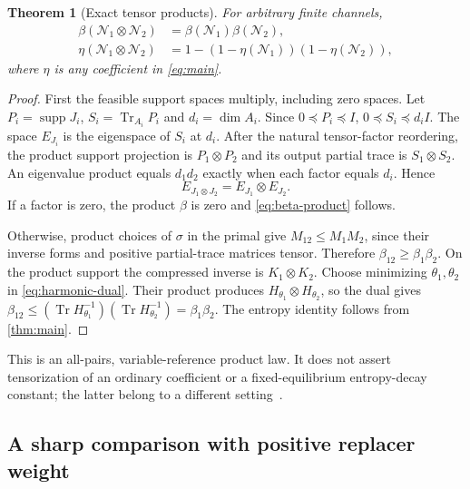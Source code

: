 \documentclass[11pt]{article}
\numberwithin{equation}{section}
\newtheorem{theorem}{Theorem}[section]
\theoremstyle{definition}
\theoremstyle{remark}
\DeclareMathOperator{\Tr}{Tr}
\DeclareMathOperator{\supp}{supp}
\newcommand{\N}{\mathcal N}
\begin{document}
\begin{theorem}[Exact tensor products]
\label{thm:products}
For arbitrary finite channels,
\begin{align}
 \beta(\N_1\otimes\N_2)&=\beta(\N_1)\beta(\N_2), \label{eq:beta-product}\\
 \eta(\N_1\otimes\N_2)
 &=1-(1-\eta(\N_1))(1-\eta(\N_2)), \label{eq:eta-product}
\end{align}
where $\eta$ is any coefficient in \eqref{eq:main}.
\end{theorem}
\begin{proof}
First the feasible support spaces multiply, including zero spaces.
Let $P_i=\supp J_i$, $S_i=\Tr_{A_i}P_i$ and $d_i=\dim A_i$.
Since $0\preceq P_i\preceq I$, $0\preceq S_i\preceq d_iI$.
The space $E_{J_i}$ is the eigenspace of $S_i$ at $d_i$.
After the natural tensor-factor reordering,
the product support projection is $P_1\otimes P_2$ and its output
partial trace is $S_1\otimes S_2$.
An eigenvalue product equals $d_1d_2$ exactly when each factor equals
$d_i$. Hence
\[
 E_{J_1\otimes J_2}=E_{J_1}\otimes E_{J_2}.
\]
If a factor is zero, the product $\beta$ is zero and
\eqref{eq:beta-product} follows.

Otherwise, product choices of $\sigma$ in the primal give
$M_{12}\leq M_1M_2$, since their inverse forms and positive
partial-trace matrices tensor. Therefore
$\beta_{12}\geq\beta_1\beta_2$.
On the product support the compressed inverse is $K_1\otimes K_2$.
Choose minimizing $\theta_1,\theta_2$ in \eqref{eq:harmonic-dual}.
Their product produces $H_{\theta_1}\otimes H_{\theta_2}$, so the dual
gives
$\beta_{12}\leq(\Tr H_{\theta_1}^{-1})(\Tr H_{\theta_2}^{-1})
=\beta_1\beta_2$.
The entropy identity follows from \cref{thm:main}.
\end{proof}

This is an all-pairs, variable-reference product law. It does not assert
tensorization of an ordinary coefficient or a fixed-equilibrium entropy-decay
constant; the latter belong to a different setting~\cite{GR22}.

\subsection{A sharp comparison with positive replacer weight}
\end{document}
